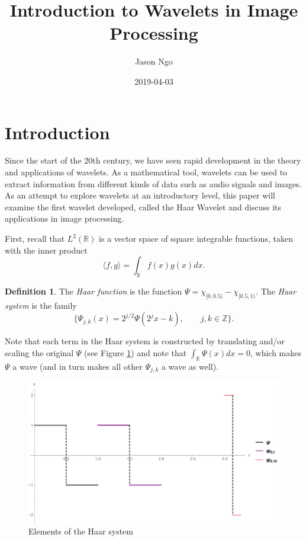 \documentclass[11pt]{amsart}
\title{Introduction to Wavelets in Image Processing}
\author{Jason Ngo}
\date{2019-04-03}
\theoremstyle{theorem} %
\theoremstyle{definition}
\newtheorem{defn}[thm]{Definition}
\theoremstyle{example}
\theoremstyle{remark}
\numberwithin{equation}{section}
\newcommand{\R}{\mathbb{R}}
\newcommand{\Z}{\mathbb{Z}}
\begin{document}
\maketitle

\section{Introduction}
Since the start of the 20th century, we have seen rapid development in the theory and applications of wavelets. As a mathematical tool, wavelets can be used to extract information from different kinds of data such as audio signals and images. As an attempt to explore wavelets at an introductory level, this paper will examine the first wavelet developed, called the Haar Wavelet and discuss its applications in image processing.

\vspace{8pt}
First, recall that \emph{$ L^2(\R) $} is a vector space of square integrable functions, taken with the inner product
\[ \langle f,g \rangle = \int_{\R} f(x) g(x)  dx. \]

\begin{defn} \label{haar}
	The \emph{Haar function} is the function $ \varPsi = \chi_{[0,0.5)} - \chi_{[0.5,1)} $. The \emph{Haar system} is the family
	\[ \{ \varPsi_{j,k}(x) = 2^{j/2} \varPsi (2^j x-k), \qquad j,k \in \Z \}. \]
\end{defn}

	Note that each term in the Haar system is constructed by translating and/or scaling the original $ \varPsi $ (see Figure \ref{fig:haarsystem}) and note that 
	$ \int_{\R} \varPsi(x)dx = 0 $, which makes $ \varPsi $ a wave (and in turn makes all other $ \varPsi_{j,k} $ a wave as well).
	
	\begin{figure}[h]
		\centering
		\includegraphics[width=0.7\linewidth]{img/haar_system}
		\caption[Elements of the Haar system]{Elements of the Haar system}
		\label{fig:haarsystem}
	\end{figure}
	
\end{document}
